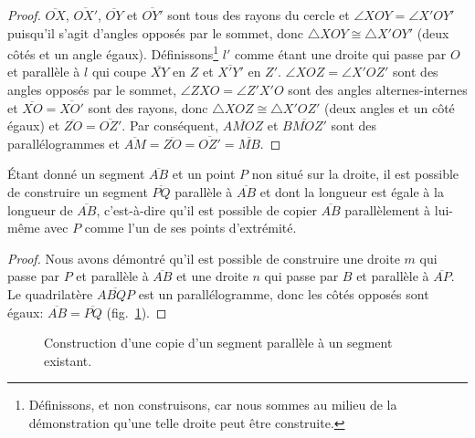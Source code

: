 \begin{proof}
$\overline{OX}$, $\overline{OX'}$, $\overline{OY}$ et $\overline{OY'}$ sont tous des rayons du cercle et $\angle XOY = \angle X'OY'$ puisqu'il s'agit d'angles opposés par le sommet, donc $\triangle XOY\cong\triangle X'OY'$ (deux côtés et un angle égaux). Définissons\footnote{Définissons, et non construisons, car nous sommes au milieu de la démonstration qu'une telle droite peut être construite.} $l'$ comme étant une droite qui passe par $O$ et parallèle à $l$ qui coupe $\overline{XY}$ en $Z$ et $\overline{X'Y'}$ en $Z'$. $\angle XOZ=\angle X'OZ'$ sont des angles opposés par le sommet, $\angle ZXO=\angle Z'X'O$ sont des angles  alternes-internes et $\overline{XO}=\overline{XO'}$ sont des rayons, donc $\triangle XOZ\cong\triangle X'OZ'$ (deux angles et un côté égaux) et $\overline{ZO}=\overline{OZ'}$. Par conséquent, $\overline{AMOZ}$ et $\overline{BMOZ'}$ sont des parallélogrammes et $\overline{AM}=\overline{ZO}=\overline{OZ'}=\overline{MB}$.
\end{proof}

\begin{theorem}\label{th:p12}
Étant donné un segment $\overline{AB}$ et un point $P$ non situé sur la droite, il est possible de construire un segment  $\overline{PQ}$ parallèle à $\overline{AB}$ et dont la longueur est égale à la longueur de $\overline{AB}$, c'est-à-dire qu'il est possible de copier $\overline{AB}$ parallèlement à lui-même avec $P$ comme l'un de ses points d'extrémité.
\end{theorem}

\begin{proof}
Nous avons démontré qu'il est possible de construire une droite $m$ qui passe par $P$ et parallèle à $\overline{AB}$ et une droite $n$ qui passe par $B$ et parallèle à $\overline{AP}$. Le quadrilatère $\overline{ABQP}$ est un parallélogramme, donc les côtés opposés sont égaux: $\overline{AB}=\overline{PQ}$ (fig.~\ref{f.se-parallel-other4}).
\end{proof}

\begin{figure}[htbp]
\centering {}
\caption{Construction d'une copie d'un segment parallèle à un segment  existant.}\label{f.se-parallel-other4}
\end{figure}

